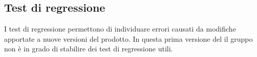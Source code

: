 \subsection{Test di regressione}
I test di regressione permettono di individuare errori causati da modifiche apportate a nuove versioni del prodotto. In questa prima versione del \PdQv{} il gruppo non è in grado di stabilire dei test di regressione utili.
